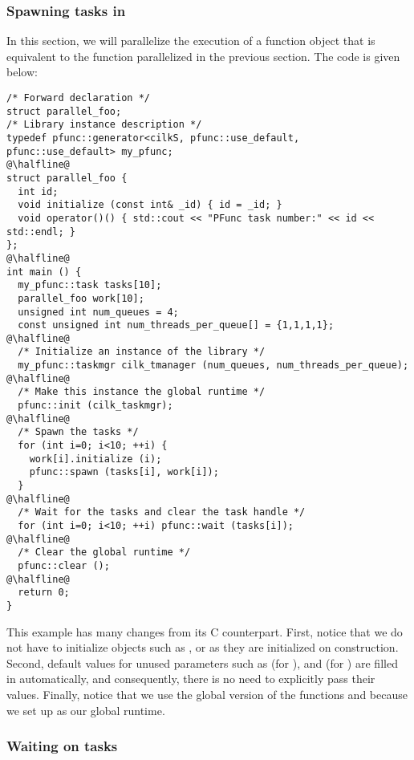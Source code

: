 \subsubsection{Spawning tasks in \Cpp{}}
\label{subsubsec:spawn_cxx}
In this section, we will parallelize the execution of a function object that is
equivalent to the function parallelized in the previous section. The code is 
given below:
%
\begin{lstlisting}
/* Forward declaration */
struct parallel_foo;
/* Library instance description */
typedef pfunc::generator<cilkS, pfunc::use_default, pfunc::use_default> my_pfunc;
@\halfline@
struct parallel_foo {
  int id;
  void initialize (const int& _id) { id = _id; }
  void operator()() { std::cout << "PFunc task number:" << id << std::endl; }
};
@\halfline@
int main () {
  my_pfunc::task tasks[10];
  parallel_foo work[10];
  unsigned int num_queues = 4;
  const unsigned int num_threads_per_queue[] = {1,1,1,1};
@\halfline@
  /* Initialize an instance of the library */
  my_pfunc::taskmgr cilk_tmanager (num_queues, num_threads_per_queue);
@\halfline@
  /* Make this instance the global runtime */
  pfunc::init (cilk_taskmgr);
@\halfline@
  /* Spawn the tasks */
  for (int i=0; i<10; ++i) {
    work[i].initialize (i);
    pfunc::spawn (tasks[i], work[i]);
  }
@\halfline@
  /* Wait for the tasks and clear the task handle */
  for (int i=0; i<10; ++i) pfunc::wait (tasks[i]);
@\halfline@
  /* Clear the global runtime */
  pfunc::clear ();
@\halfline@
  return 0;
}
\end{lstlisting}
%
This example has many changes from its C counterpart. 
%
First, notice that we do not have to initialize objects such as ,
 or  as they are initialized on construction. 
%
Second, default values for unused parameters such as  (for
),  and  (for
) are filled in automatically, and consequently, there is no
need to explicitly pass their values. 
%
Finally, notice that we use the global version of the functions 
and  because we set up  as our global runtime.

\subsubsection{Waiting on tasks}

